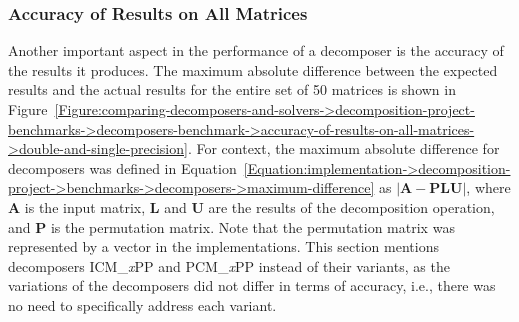 \subsubsection{Accuracy of Results on All Matrices}\label{Subsection:comparing-decomposers-and-solvers->decomposition-project-benchmarks->decomposers-benchmark->accuracy-of-results-on-all-matrices}
Another important aspect in the performance of a decomposer is the accuracy of the results it produces. The maximum absolute difference between the expected results and the actual results for the entire set of 50 matrices is shown in Figure~\ref{Figure:comparing-decomposers-and-solvers->decomposition-project-benchmarks->decomposers-benchmark->accuracy-of-results-on-all-matrices->double-and-single-precision}. For context, the maximum absolute difference for decomposers was defined in Equation~\ref{Equation:implementation->decomposition-project->benchmarks->decomposers->maximum-difference} as $\left| \mathbf{A} - \mathbf{PLU} \right|$, where $\mathbf{A}$ is the input matrix, $\mathbf{L}$ and $\mathbf{U}$ are the results of the decomposition operation, and $\mathbf{P}$ is the permutation matrix. Note that the permutation matrix was represented by a vector in the implementations. This section mentions decomposers ICM\_\textit{x}PP and PCM\_\textit{x}PP instead of their variants, as the variations of the decomposers did not differ in terms of accuracy, i.e., there was no need to specifically address each variant.

